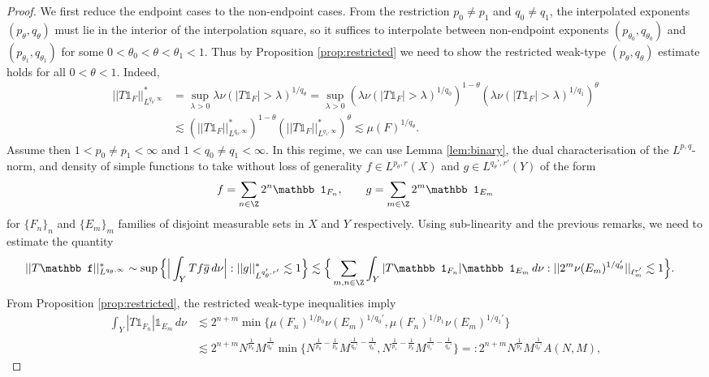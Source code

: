 \documentclass[reqno]{amsart}
\theoremstyle{definition}
\theoremstyle{remark}
\begin{document}
\begin{proof}
	We first reduce the endpoint cases to the non-endpoint cases. From the restriction $p_0 \neq p_1$ and $q_0 \neq q_1$, the interpolated exponents $(p_\theta, q_\theta)$ must lie in the interior of the interpolation square, so it suffices to interpolate between non-endpoint exponents $(p_{\theta_0}, q_{\theta_0})$ and $(p_{\theta_1}, q_{\theta_1})$ for some $0 < \theta_0 < \theta < \theta_1 < 1$. Thus by Proposition \ref{prop:restricted} we need to show the restricted weak-type $(p_\theta, q_\theta)$ estimate holds for all $0 < \theta < 1$. Indeed, 
		\begin{align*}
			 ||T\mathbb 1_F ||_{L^{q_\theta, \infty}}^*
			 	&= \sup_{\lambda > 0} \lambda \nu (|T\mathbb 1_F| > \lambda)^{1/q_\theta} =  \sup_{\lambda > 0} \left(\lambda \nu (|T\mathbb 1_F| > \lambda)^{1/q_0}\right)^{1 - \theta} \left(\lambda \nu (|T\mathbb 1_F| > \lambda)^{1/q_1}\right)^{\theta} \\
			 	&\lesssim \left(||T\mathbb 1_F||_{L^{q_0, \infty}}^*\right)^{1 - \theta} \left(||T\mathbb 1_F||_{L^{q_1, \infty}}^*\right)^{\theta} \lesssim \mu (F)^{1/q_\theta}.
		\end{align*}	 
	Assume then $1 < p_0 \neq p_1 < \infty$ and $1 < q_0 \neq q_1 < \infty$. 	In this regime, we can use Lemma \ref{lem:binary}, the dual characterisation of the $L^{p, q}$-norm, and density of simple functions to take without loss of generality $f \in L^{p_\theta, r} (X)$ and $g \in L^{q_\theta', r'} (Y)$ of the form
		\[ f = \sum_{n \in \Z} 2^n \mathbb 1_{F_n}, \qquad g = \sum_{m \in \Z} 2^m \mathbb 1_{E_m} \]
	for $\{F_n\}_n$ and $\{E_m\}_m$ families of disjoint measurable sets in $X$ and $Y$ respectively. Using sub-linearity and the previous remarks, we need to estimate the quantity
		\begin{align*}
			||T\mathbb f ||_{L^{q_\theta, \infty}}^* 
				&\sim \sup \Big\{ \Big| \int_Y Tf \overline g \, d \nu \Big| : ||g||_{L^{q_\theta', r'}}^* \lesssim 1 \Big\} \lesssim \Big\{ \sum_{m, n \in \Z} \int_Y |T \mathbb 1_{F_n}| \mathbb 1_{E_m} \, d\nu : ||2^m \nu (E_m)^{1/q_\theta'} ||_{\ell^{r'}_m} \lesssim 1 \Big\}.
		\end{align*}	
	From Proposition \ref{prop:restricted}, the restricted weak-type inequalities imply
		 \begin{align*}
		 	\int_Y |T \mathbb 1_{F_n}| \mathbb 1_{E_m} \, d\nu 
		 		&\lesssim 2^{n + m} \min \{ \mu(F_n)^{1/p_0} \nu(E_m)^{1/q_0'},   \mu(F_n)^{1/p_1} \nu(E_m)^{1/q_1'}\} \\
		 		&\lesssim  2^{n + m} N^{\frac{1}{p_\theta}} M^{\frac{1}{q_\theta'}}\min \{ N^{\frac{1}{p_0} - \frac{1}{p_\theta}} M^{\frac{1}{q_0'} - \frac{1}{q_\theta'}}, N^{\frac{1}{p_1} - \frac{1}{p_\theta}} M^{\frac{1}{q_1'} - \frac{1}{q_\theta'}} \} =:2^{n + m} N^{\frac{1}{p_\theta}} M^{\frac{1}{q_\theta'}} A(N, M) ,

\end{align*}
\end{proof}
\end{document}
